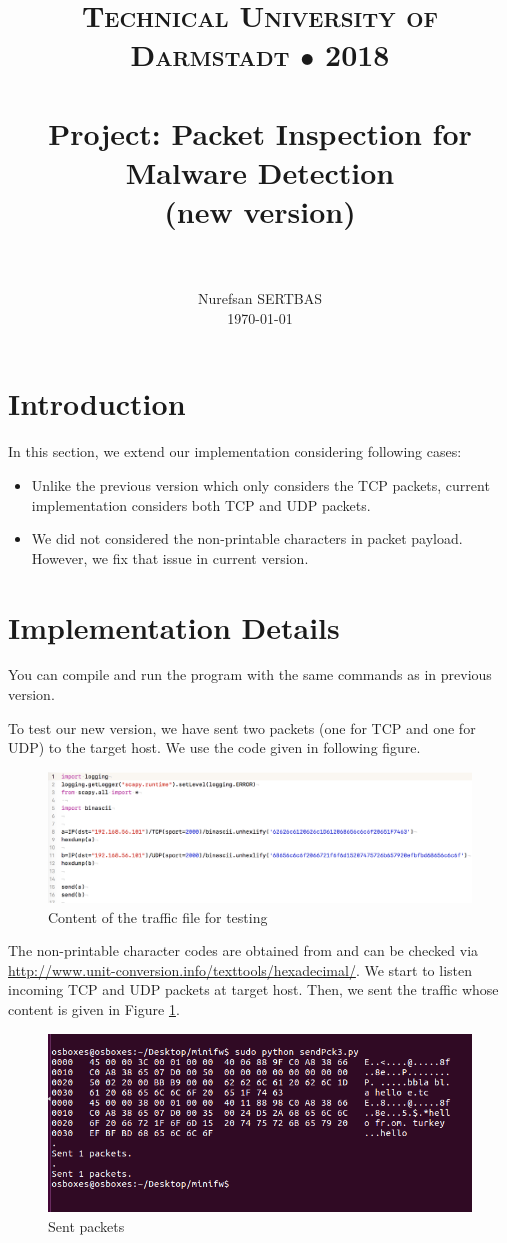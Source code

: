 \documentclass[paper=a4, fontsize=11pt]{scrartcl}
\title{
		\usefont{OT1}{bch}{b}{n}
		\normalfont \normalsize \textsc{Technical University of Darmstadt $ \bullet$ 2018} \\ [25pt]
		\horrule{0.5pt} \\[0.4cm]
		\huge Project: Packet Inspection for Malware Detection \\
        \small (new version) \\
		\horrule{2pt} \\[0.5cm]
}
\author{
		\normalfont 								\normalsize
        Nurefsan SERTBAS\\[-3pt]		\normalsize
        \today
}
\date{}
\numberwithin{equation}{section}		%
\numberwithin{figure}{section}			%
\numberwithin{table}{section}				%
\begin{document}
\maketitle %
\section{Introduction}
In this section, we extend our implementation considering following cases:


\begin{itemize}
    \item Unlike the previous version which only considers the TCP packets, current implementation considers both TCP and UDP packets.
    \item We did not considered the non-printable characters in packet payload. However, we fix that issue in current version.
\end{itemize}



\section{Implementation Details}
You can compile and run the program with the same commands as in previous version. 

To test our new version, we have sent two packets (one for TCP and one for UDP) to the target host. We use the code given in following figure.

\begin{figure}[H]
\centering
\includegraphics[width=\textwidth]{img2/traffic.png}
\caption{Content of the traffic file for testing}
\end{figure}

The non-printable character codes are obtained from \cite{r5} and can be checked via \url{http://www.unit-conversion.info/texttools/hexadecimal/}. We start to listen incoming TCP and UDP packets at target host. Then, we sent the traffic whose content is given in Figure \ref{traffic}.

\begin{figure}[H]
\centering
\includegraphics[width=\textwidth]{img2/utraf.png}
\caption{Sent packets} \label{traffic}
\end{figure}
\end{document}
